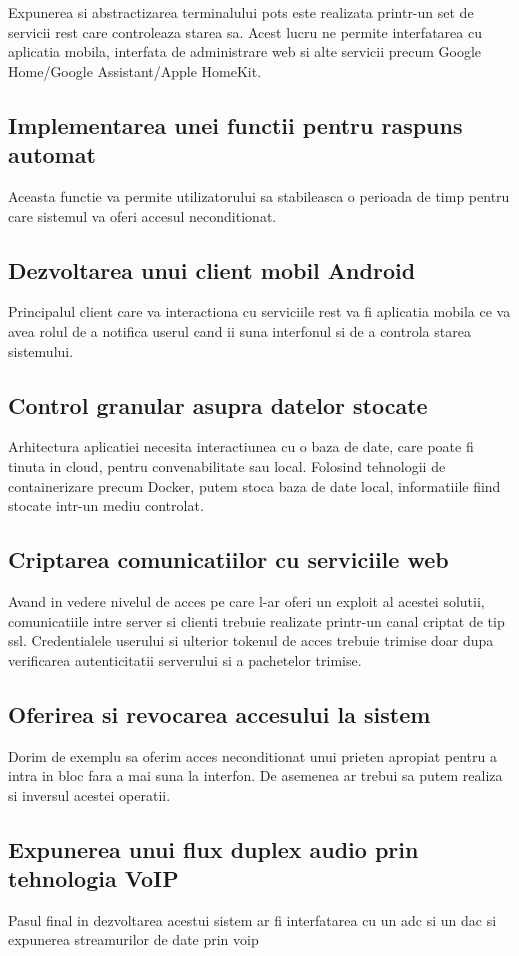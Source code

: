 Expunerea si abstractizarea terminalului \acrshort{pots} este realizata printr-un set de servicii \acrfull{rest} care controleaza starea sa. Acest lucru ne permite interfatarea cu aplicatia mobila, interfata de administrare web si alte servicii precum Google Home/Google Assistant/Apple HomeKit.

\subsection{Implementarea unei functii pentru raspuns automat}

Aceasta functie va permite utilizatorului sa stabileasca o perioada de timp pentru care sistemul va oferi accesul neconditionat.

\subsection{Dezvoltarea unui client mobil Android}

Principalul client care va interactiona cu serviciile \acrshort{rest} va fi aplicatia mobila ce va avea rolul de a notifica userul cand ii suna interfonul si de a controla starea sistemului.

\subsection{Control granular asupra datelor stocate}

Arhitectura aplicatiei necesita interactiunea cu o baza de date, care poate fi tinuta in cloud, pentru convenabilitate sau local.
Folosind tehnologii de containerizare precum Docker, putem stoca baza de date local, informatiile fiind stocate intr-un mediu controlat.

\subsection{Criptarea comunicatiilor cu serviciile web}

Avand in vedere nivelul de acces pe care l-ar oferi un exploit al acestei solutii, comunicatiile intre server si clienti trebuie realizate printr-un canal criptat de tip \acrfull{ssl}. Credentialele userului si ulterior tokenul de acces trebuie trimise doar dupa verificarea autenticitatii serverului si a pachetelor trimise.

\subsection{Oferirea si revocarea accesului la sistem}

Dorim de exemplu sa oferim acces neconditionat unui prieten apropiat pentru a intra in bloc fara a mai suna la interfon. De asemenea ar trebui sa putem realiza si inversul acestei operatii.

\subsection{Expunerea unui flux duplex audio prin tehnologia VoIP}

Pasul final in dezvoltarea acestui sistem ar fi interfatarea cu un \acrfull{adc} si un \acrfull{dac} si expunerea streamurilor de date prin \acrfull{voip}
